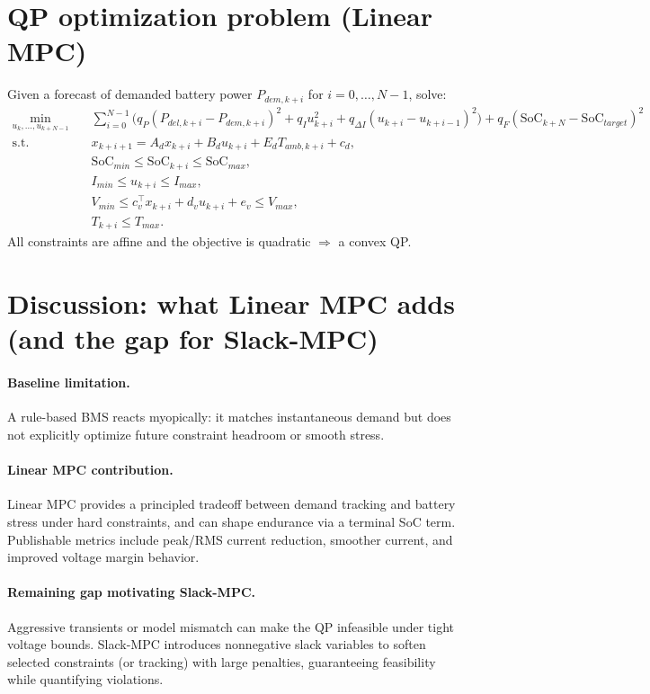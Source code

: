 \documentclass[10pt]{article}
\begin{document}
\section{QP optimization problem (Linear MPC)}
Given a forecast of demanded battery power $P_{dem,k+i}$ for $i=0,\dots,N-1$, solve:
\begin{align}
\min_{u_k,\dots,u_{k+N-1}}\quad
&\sum_{i=0}^{N-1}\Big(
q_P (P_{del,k+i}-P_{dem,k+i})^2
+ q_I u_{k+i}^2
+ q_{\Delta I}(u_{k+i}-u_{k+i-1})^2
\Big) + q_F(\mathrm{SoC}_{k+N}-\mathrm{SoC}_{target})^2 \\
\text{s.t.}\quad
&x_{k+i+1} = A_d x_{k+i} + B_d u_{k+i} + E_d T_{amb,k+i} + c_d,\\
&\mathrm{SoC}_{min} \le \mathrm{SoC}_{k+i} \le \mathrm{SoC}_{max},\\
&I_{min} \le u_{k+i} \le I_{max},\\
&V_{min} \le c_v^\top x_{k+i} + d_v u_{k+i} + e_v \le V_{max},\\
&T_{k+i} \le T_{max}.
\end{align}
All constraints are affine and the objective is quadratic $\Rightarrow$ a convex QP.

\section{Discussion: what Linear MPC adds (and the gap for Slack-MPC)}
\paragraph{Baseline limitation.}
A rule-based BMS reacts myopically: it matches instantaneous demand but does not explicitly optimize future constraint headroom or smooth stress.

\paragraph{Linear MPC contribution.}
Linear MPC provides a principled tradeoff between demand tracking and battery stress under hard constraints, and can shape endurance via a terminal SoC term. Publishable metrics include peak/RMS current reduction, smoother current, and improved voltage margin behavior.

\paragraph{Remaining gap motivating Slack-MPC.}
Aggressive transients or model mismatch can make the QP infeasible under tight voltage bounds. Slack-MPC introduces nonnegative slack variables to soften selected constraints (or tracking) with large penalties, guaranteeing feasibility while quantifying violations.
\end{document}
